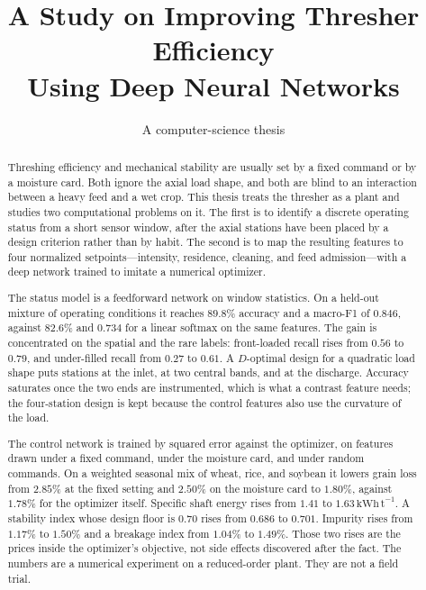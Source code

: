 \documentclass[12pt,a4paper]{report}
\title{A Study on Improving Thresher Efficiency\\Using Deep Neural Networks}
\author{A computer-science thesis}
\date{}
\begin{document}
\maketitle
\thispagestyle{empty}

\begin{abstract}
\noindent
Threshing efficiency and mechanical stability are usually set by a fixed command or by a moisture card. Both ignore the axial load shape, and both are blind to an interaction between a heavy feed and a wet crop. This thesis treats the thresher as a plant and studies two computational problems on it. The first is to identify a discrete operating status from a short sensor window, after the axial stations have been placed by a design criterion rather than by habit. The second is to map the resulting features to four normalized setpoints---intensity, residence, cleaning, and feed admission---with a deep network trained to imitate a numerical optimizer.

The status model is a feedforward network on window statistics. On a held-out mixture of operating conditions it reaches \(89.8\%\) accuracy and a macro-F1 of \(0.846\), against \(82.6\%\) and \(0.734\) for a linear softmax on the same features. The gain is concentrated on the spatial and the rare labels: front-loaded recall rises from \(0.56\) to \(0.79\), and under-filled recall from \(0.27\) to \(0.61\). A \(D\)-optimal design for a quadratic load shape puts stations at the inlet, at two central bands, and at the discharge. Accuracy saturates once the two ends are instrumented, which is what a contrast feature needs; the four-station design is kept because the control features also use the curvature of the load.

The control network is trained by squared error against the optimizer, on features drawn under a fixed command, under the moisture card, and under random commands. On a weighted seasonal mix of wheat, rice, and soybean it lowers grain loss from \(2.85\%\) at the fixed setting and \(2.50\%\) on the moisture card to \(1.80\%\), against \(1.78\%\) for the optimizer itself. Specific shaft energy rises from \(1.41\) to \(1.63\,\mathrm{kWh\,t^{-1}}\). A stability index whose design floor is \(0.70\) rises from \(0.686\) to \(0.701\). Impurity rises from \(1.17\%\) to \(1.50\%\) and a breakage index from \(1.04\%\) to \(1.49\%\). Those two rises are the prices inside the optimizer's objective, not side effects discovered after the fact. The numbers are a numerical experiment on a reduced-order plant. They are not a field trial.
\end{abstract}
\end{document}
